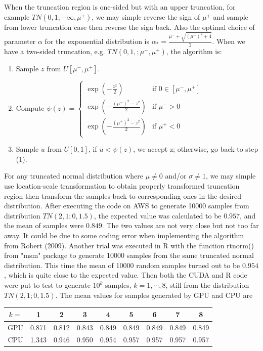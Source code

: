 \documentclass[12pt]{article}
\begin{document}
When the truncation region is one-sided but with an upper truncation, for example $TN(0, 1;-\infty, \mu^+)$, we may simple reverse the sign of $\mu^+$ and sample from lower truncation case then reverse the sign back. Also the optimal choice of parameter $\alpha$ for the exponential distribution is $\alpha_* = \frac{\mu^-+\sqrt{(\mu^-)^2+4}}{2}$.\newline
When we have a two-sided truncation, e.g. $TN(0, 1,;\mu^-, \mu^+)$, the algorithm is:
\begin{enumerate}[(1)]
	\item Sample $z$ from $U[\mu^-, \mu^+]$.
	\item Compute $\psi(z) = \begin{cases}
		\exp(-\frac{z^2}{2}) &\mbox{if } 0 \in [\mu^-, \mu^+] \\
		\exp(-\frac{(\mu^-)^2 - z^2}{2}) &\mbox{if } \mu^- > 0\\
		\exp(-\frac{(\mu^+)^2 - z^2}{2}) &\mbox{if } \mu^+ < 0
	\end{cases}$
	\item Sample $u$ from $U[0,1]$, if $u < \psi(z)$, we accept z; otherwise, go back to step (1).
\end{enumerate}
For any truncated normal distribution where $\mu \neq 0$ and/or $\sigma \neq 1$, we may simple use location-scale transformation to obtain properly transformed truncation region then transform the samples back to corresponding ones in the desired distribution.\newline
After executing the code on AWS to generate 10000 samples from distribution $TN(2,1;0, 1.5)$, the expected value was calculated to be $0.957$, and the mean of samples were $0.849$. The two values are not very close but not too far away. It could be due to some coding error when implementing the algorithm from Robert (2009). \newline
Another trial was executed in R with the function rtnorm() from "msm" package to generate 10000 samples from the same truncated normal distribution. This time the mean of 10000 random samples turned out to be $0.954$, which is quite close to the expected value.\newline
Then both the CUDA and R code were put to test to generate $10^k$ samples, $k = 1, \cdots, 8$, still from the distribution $TN(2,1;0, 1.5)$. The mean values for samples generated by GPU and CPU are
\begin{center}
	\begin{tabular}{|c|c|c|c|c|c|c|c|c|}
	\hline
	$k=$ & 1 & 2 & 3 & 4 & 5 & 6 & 7 & 8 \\
	\hline
	GPU & 0.871 & 0.812 & 0.843 & 0.849 & 0.849 & 0.849 & 0.849 &  0.849 \\
	\hline
	CPU & 1.343 & 0.946 & 0.950 & 0.954 & 0.957 & 0.957 & 0.957 & 0.957 \\
	\hline
	\end{tabular}
\end{center}
\end{document}

